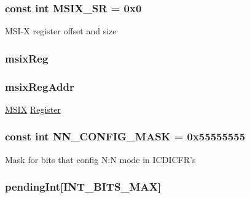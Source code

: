 \label{classPl390_a6f1a976e6a4f72a669c64334981f2220}
\hypertarget{classPl390_a75f82acd63e66c4ab659e0889281e35b}{
\subsubsection[{MSIX\_\-SR}]{\setlength{\rightskip}{0pt plus 5cm}const int {\bf MSIX\_\-SR} = 0x0}}
\label{classPl390_a75f82acd63e66c4ab659e0889281e35b}
MSI-\/X register offset and size \hypertarget{classPl390_aa646cfd25d072cc06bfb25fc3cb18890}{
\subsubsection[{msixReg}]{ {\bf msixReg}}}
\label{classPl390_aa646cfd25d072cc06bfb25fc3cb18890}
\hypertarget{classPl390_ae9eb70129c76fd704086093bcdd21471}{
\subsubsection[{msixRegAddr}]{ {\bf msixRegAddr}}}
\label{classPl390_ae9eb70129c76fd704086093bcdd21471}
\hyperlink{structMSIX}{MSIX} \hyperlink{classRegister}{Register} \hypertarget{classPl390_a7595fc36770609b9fef1a639ce0b3c84}{
\subsubsection[{NN\_\-CONFIG\_\-MASK}]{\setlength{\rightskip}{0pt plus 5cm}const int {\bf NN\_\-CONFIG\_\-MASK} = 0x55555555}}
\label{classPl390_a7595fc36770609b9fef1a639ce0b3c84}
Mask for bits that config N:N mode in ICDICFR's \hypertarget{classPl390_a4a5f5a9735da74511b9d4e02c4ace364}{
\subsubsection[{pendingInt}]{ {\bf pendingInt}\mbox{[}{\bf INT\_\-BITS\_\-MAX}\mbox{]}}}
